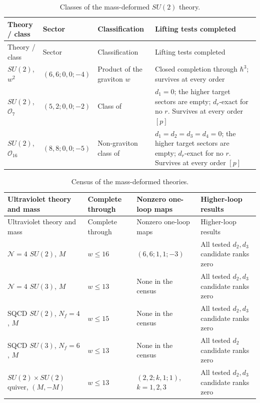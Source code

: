 \documentclass[11pt]{article}
\numberwithin{equation}{section}
\numberwithin{figure}{section}
\numberwithin{table}{section}
\begin{document}
{\footnotesize\renewcommand{\arraystretch}{1.3}\setlength{\tabcolsep}{3.5pt}
\begin{xltabular}{\linewidth}{|l|l|>{\raggedright\arraybackslash}X|>{\raggedright\arraybackslash}X|}
\caption{Classes of the mass-deformed $SU(2)$ theory.}\label{local-ch9-mass-classes}\\
\hline
Theory / class & Sector & Classification & Lifting tests completed\\
\hline\endfirsthead
\hline
Theory / class & Sector & Classification & Lifting tests completed\\
\hline\endhead
$SU(2)$, $w^2$ & $(6,6;0,0;-4)$ & Product of the graviton $w$ & Closed completion through $\hbar^3$; survives at every order\\
\hline
$SU(2)$, $\mathcal O_7$ & $(5,2;0,0;-2)$ & Class of \cite{CK} & $d_1=0$; the higher target sectors are empty; $d_r$-exact for no $r$. Survives at every order $[p]$\\
\hline
$SU(2)$, $\mathcal O_{16}$ & $(8,8;0,0;-5)$ & Non-graviton class of \cite{CK} & $d_1=d_2=d_3=d_4=0$; the higher target sectors are empty; $d_r$-exact for no $r$. Survives at every order $[p]$\\
\hline
\end{xltabular}}

{\footnotesize\renewcommand{\arraystretch}{1.3}\setlength{\tabcolsep}{3.5pt}
\begin{xltabular}{\linewidth}{|>{\raggedright\arraybackslash}X|l|>{\raggedright\arraybackslash}p{3.1cm}|>{\raggedright\arraybackslash}X|}
\caption{Census of the mass-deformed theories.}\label{local-ch9-mass-census}\\
\hline
Ultraviolet theory and mass & Complete through & Nonzero one-loop maps & Higher-loop results\\
\hline\endfirsthead
\hline
Ultraviolet theory and mass & Complete through & Nonzero one-loop maps & Higher-loop results\\
\hline\endhead
$\mathcal N=4$ $SU(2)$, $M$ & $w\le16$ & $(6,6;1,1;-3)$ & All tested $d_2,d_3$ candidate ranks zero\\
\hline
$\mathcal N=4$ $SU(3)$, $M$ & $w\le13$ & None in the census & All tested $d_2,d_3$ candidate ranks zero\\
\hline
SQCD $SU(2)$, $N_f=4$, $M$ & $w\le15$ & None in the census & All tested $d_2,d_3$ candidate ranks zero\\
\hline
SQCD $SU(3)$, $N_f=6$, $M$ & $w\le13$ & None in the census & All tested $d_2$ candidate ranks zero\\
\hline
$SU(2)\times SU(2)$ quiver, $(M,-M)$ & $w\le13$ & $(2,2;k,1;1)$, $k=1,2,3$ & All tested $d_2,d_3$ candidate ranks zero\\
\hline
\end{xltabular}}
\end{document}
